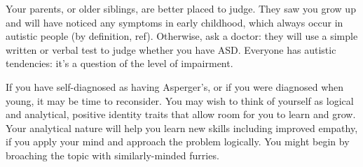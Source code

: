 Your parents, or older siblings, are better placed to judge. They saw you grow up and will have noticed any symptoms in early childhood, which always occur in autistic people (by definition, ref). Otherwise, ask a doctor: they will use a simple written or verbal test to judge whether you have ASD. Everyone has autistic tendencies: it's a question of the level of impairment.

If you have self-diagnosed as having Asperger's, or if you were diagnosed when young, it may be time to reconsider. You may wish to think of yourself as logical and analytical, positive identity traits that allow room for you to learn and grow. Your analytical nature will help you learn new skills including improved empathy, if you apply your mind and approach the problem logically. You might begin by broaching the topic with similarly-minded furries.
